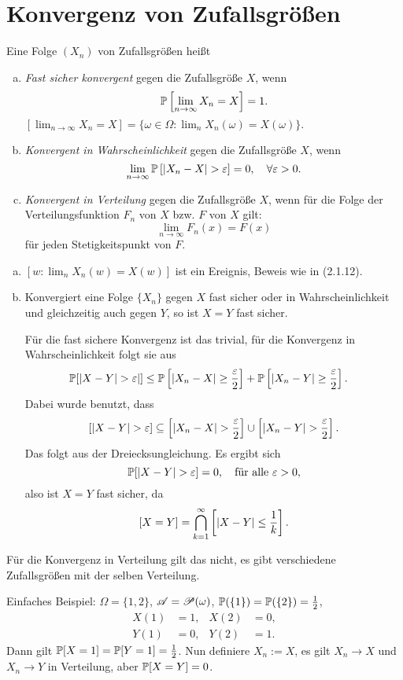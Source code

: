 \section{Konvergenz von Zufallsgrößen}
\begin{defn}
  Eine Folge $(X_n)$ von Zufallsgrößen heißt
  \begin{enumerate}[a)]
  \item \emph{Fast sicher konvergent} gegen die Zufallsgröße $X$, wenn
    \[ \mathbb{P} \left[ \lim_{n \to \infty} X_n = X \right] = 1. \]
    $\left[ \lim_{n \to \infty} X_n = X \right] = \{ \omega \in \Omega : \lim_n
    X_n(\omega) = X(\omega) \}.$
  \item \emph{Konvergent in Wahrscheinlichkeit} gegen die Zufallsgröße $X$, wenn
    \[ \lim_{n \to \infty} \mathbb{P} \left[ |X_n-X| > \varepsilon \right] = 0 , \quad \forall
      \varepsilon > 0. \]
  \item \emph{Konvergent in Verteilung} gegen die Zufallsgröße $X$, wenn für die
    Folge der Verteilungsfunktion $F_n$ von $X$ bzw. $F$ von $X$ gilt:
    \[ \lim_{n \to \infty} F_n(x) = F(x) \]
    für jeden Stetigkeitspunkt von $F$.
  \end{enumerate}
\end{defn}

\begin{rmrk}
  \begin{enumerate}[(a)]
  \item $[w : \lim_n X_n(w) = X(w)]$ ist ein Ereignis, Beweis wie in (2.1.12).
  \item Konvergiert eine Folge $\{X_n\}$ gegen $X$ fast sicher oder in
    Wahrscheinlichkeit und gleichzeitig auch gegen $Y$, so ist $X=Y$ fast
    sicher.

    Für die fast sichere Konvergenz ist das trivial, für die Konvergenz in
    Wahrscheinlichkeit folgt sie aus
    \begin{align*}
      \mathbb{P} [ |X-Y| > \varepsilon | ]
      &\le \mathbb{P} \left[ |X_n - X| \ge \frac{\varepsilon}{2} \right]
        + \mathbb{P} \left[ |X_n - Y| \ge \frac{\varepsilon}{2} \right].
    \end{align*}
    Dabei wurde benutzt, dass
    \[ [|X-Y| > \varepsilon ] \subseteq
      \left[ |X_n-X| > \frac{\varepsilon}{2} \right] \cup
      \left[ |X_n-Y| > \frac{\varepsilon}{2} \right].
    \]
    Das folgt aus der Dreiecksungleichung. Es ergibt sich
    \[ \mathbb{P} [ |X-Y| > \varepsilon ] = 0, \quad \text{für alle } \varepsilon > 0,  \]
    also ist $X=Y$ fast sicher, da
    \[ [X=Y] = \bigcap_{k=1}^\infty \left[ |X-Y| \le \frac{1}{k} \right]. \]
  \end{enumerate}
  Für die Konvergenz  in Verteilung gilt das nicht, es gibt verschiedene
  Zufallsgrößen mit der selben Verteilung.

  Einfaches Beispiel: $\Omega = \{1,2\}$, $\mathscr{A} = \mathscr{P}(\omega)$, $\mathbb{P}(\{1\}) =
  \mathbb{P}(\{2\})= \frac{1}{2}$,
  \begin{align*}
    X(1) &= 1, & X(2) &= 0, \\
    Y(1) &= 0, & Y(2) &= 1.
  \end{align*}
  Dann gilt $\mathbb{P}[X=1] = \mathbb{P}[Y=1] = \frac{1}{2}$. Nun definiere $X_n := X$, es gilt
  $X_n \to X$ und $X_n \to Y$ in Verteilung, aber $\mathbb{P}[X=Y]=0$.
\end{rmrk}

